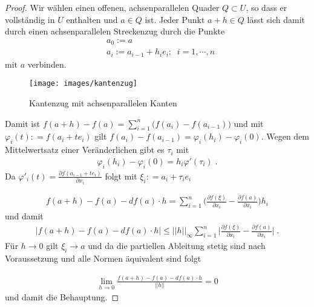 \begin{proof}
Wir wählen einen offenen, achsenparallelen Quader $Q \subset U$, so dass er vollständig in $U$ enthalten und $a \in Q$ ist.
Jeder Punkt $a + h \in Q$  lässt sich damit durch einen achsenparallelen Streckenzug durch die Punkte
\begin{align*}
& a_0 := a \\
& a_i  := a_{i-1} + h_i e_i;  \;  \;  i = 1, \cdots , n
\end{align*} 
mit $a$ verbinden. 
\begin{figure}[H]
      \centering
    \texttt{[image: images/kantenzug]}
      \caption{Kantenzug mit achsenparallelen Kanten}
\end{figure}

Damit ist $f(a + h) - f(a) = \sum_{i=1}^{n} \bigl( f (a_i)   - f(a_{i-1})   \bigr)$ und  mit $\varphi_i(t) : = f(a_i + t e_i)$ gilt 
$f(a_i) - f(a_{i-1}) = \varphi_i(h_i)  - \varphi_i(0)$. Wegen dem Mittelwertsatz einer Veränderlichen gibt  es  $\tau_i$  mit
\begin{align*}
\varphi_i(h_i)  - \varphi_i(0)  = h_i \varphi'(\tau_i) \;.
\end{align*} 
Da $\varphi'_i(t) = \frac{\partial  f(a_{i-1} + t e_i ) }{\partial x_i}$ folgt mit $\xi_i: = a_i + \tau_i e_i$ 

\begin{align*}
f(a + h) - f(a) - df(a) \cdot h = \sum_{i=1}^n  \biggl( \frac{\partial  f(\xi) }{\partial x_i} -    \frac{\partial  f(a) }{\partial x_i}   \biggr) h_i
\end{align*} 
und damit
\begin{align*}
| f(a + h) - f(a) - df(a) \cdot h |  \leq || h ||_{\infty}  \sum_{i=1}^n  \biggl| \frac{\partial  f(\xi) }{\partial x_i} -    \frac{\partial  f(a) }{\partial x_i}   \biggr | \; . 
\end{align*} 
Für $h \to 0$ gilt $\xi_i \to a$ und da die partiellen Ableitung stetig sind nach Voraussetzung und alle Normen äquivalent sind folgt

\begin{align*}
\lim_{h \to 0} \frac{ f(a + h) - f(a) - df(a) \cdot h}{||h||} = 0 
\end{align*} 
und damit die Behauptung.
\end{proof}


